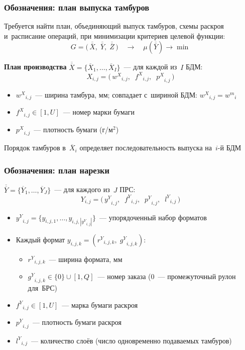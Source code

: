 \begin{frame}
    \frametitle{Обозначения: план выпуска тамбуров}
    Требуется найти план, объединяющий выпуск тамбуров, схемы раскроя и~расписание операций, при минимизации критериев целевой функции:
    \[
    \boxed{G = \bigl(\,\overline{\overline{X}},\;\overline{\overline{Y}},\;\overline{\overline{Z}}\,\bigr) \quad\longrightarrow\quad \mu(\overline{\overline{Y}})\to\min}
    \]

    \vspace{0.2cm}
    \textbf{План производства} $\overline{\overline{X}} = \{\overline{X}_1,\ldots,\overline{X}_I\}$~--- для каждой из~$I$ БДМ:
    \[
    X_{i,j} = \bigl(\,{w^X}_{i,j},\;\;{f^X}_{i,j},\;\;{p^X}_{i,j}\,\bigr)
    \]
    \begin{itemize}
        \item ${w^X}_{i,j}$~--- ширина тамбура, мм; совпадает с~шириной БДМ: ${w^X}_{i,j}={w^m}_i$
        \item ${f^X}_{i,j} \in [1,U]$~--- номер марки бумаги
        \item ${p^X}_{i,j}$~--- плотность бумаги (г/м$^2$)
    \end{itemize}
    \vspace{0.1cm}
    Порядок тамбуров в~$\overline{X}_i$ определяет последовательность выпуска на~$i$-й БДМ
\end{frame}

\begin{frame}
    \frametitle{Обозначения: план нарезки}
    $\overline{\overline{Y}} = \{\overline{Y}_1,\ldots,\overline{Y}_J\}$~--- для каждого из~$J$ ПРС:
    \[
    Y_{i,j} = \bigl(\,{y^Y}_{i,j},\;\;{f^Y}_{i,j},\;\;{p^Y}_{i,j},\;\;{l^Y}_{i,j}\,\bigr)
    \]
    \begin{itemize}
        \item ${y^Y}_{i,j} = \{y_{i,j,1},\ldots,y_{i,j,|{y^Y}_{i,j}|}\}$~--- упорядоченный набор форматов
        \item Каждый формат $y_{i,j,k} = ({r^Y}_{i,j,k},\;{g^Y}_{i,j,k})$:
        \begin{itemize}
            \item ${r^Y}_{i,j,k}$~--- ширина формата, мм
            \item ${g^Y}_{i,j,k} \in \{0\}\cup[1,Q]$~--- номер заказа ($0$~--- промежуточный рулон для~БРС)
        \end{itemize}
        \item ${f^Y}_{i,j}\in[1,U]$~--- марка бумаги раскроя
        \item ${p^Y}_{i,j}$~--- плотность бумаги раскроя
        \item ${l^Y}_{i,j}$~--- количество слоёв (число одновременно подаваемых тамбуров)
    \end{itemize}
\end{frame}

